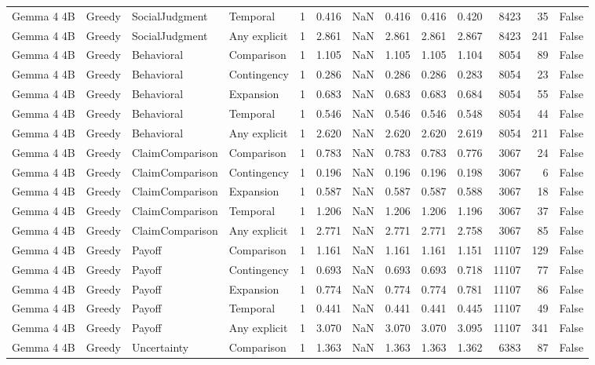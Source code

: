 \begin{tabular}{llllrrrrrrrrr}
Gemma 4 4B & Greedy & SocialJudgment & Temporal & 1 & 0.416 & NaN & 0.416 & 0.416 & 0.420 & 8423 & 35 & False \\
Gemma 4 4B & Greedy & SocialJudgment & Any explicit & 1 & 2.861 & NaN & 2.861 & 2.861 & 2.867 & 8423 & 241 & False \\
Gemma 4 4B & Greedy & Behavioral & Comparison & 1 & 1.105 & NaN & 1.105 & 1.105 & 1.104 & 8054 & 89 & False \\
Gemma 4 4B & Greedy & Behavioral & Contingency & 1 & 0.286 & NaN & 0.286 & 0.286 & 0.283 & 8054 & 23 & False \\
Gemma 4 4B & Greedy & Behavioral & Expansion & 1 & 0.683 & NaN & 0.683 & 0.683 & 0.684 & 8054 & 55 & False \\
Gemma 4 4B & Greedy & Behavioral & Temporal & 1 & 0.546 & NaN & 0.546 & 0.546 & 0.548 & 8054 & 44 & False \\
Gemma 4 4B & Greedy & Behavioral & Any explicit & 1 & 2.620 & NaN & 2.620 & 2.620 & 2.619 & 8054 & 211 & False \\
Gemma 4 4B & Greedy & ClaimComparison & Comparison & 1 & 0.783 & NaN & 0.783 & 0.783 & 0.776 & 3067 & 24 & False \\
Gemma 4 4B & Greedy & ClaimComparison & Contingency & 1 & 0.196 & NaN & 0.196 & 0.196 & 0.198 & 3067 & 6 & False \\
Gemma 4 4B & Greedy & ClaimComparison & Expansion & 1 & 0.587 & NaN & 0.587 & 0.587 & 0.588 & 3067 & 18 & False \\
Gemma 4 4B & Greedy & ClaimComparison & Temporal & 1 & 1.206 & NaN & 1.206 & 1.206 & 1.196 & 3067 & 37 & False \\
Gemma 4 4B & Greedy & ClaimComparison & Any explicit & 1 & 2.771 & NaN & 2.771 & 2.771 & 2.758 & 3067 & 85 & False \\
Gemma 4 4B & Greedy & Payoff & Comparison & 1 & 1.161 & NaN & 1.161 & 1.161 & 1.151 & 11107 & 129 & False \\
Gemma 4 4B & Greedy & Payoff & Contingency & 1 & 0.693 & NaN & 0.693 & 0.693 & 0.718 & 11107 & 77 & False \\
Gemma 4 4B & Greedy & Payoff & Expansion & 1 & 0.774 & NaN & 0.774 & 0.774 & 0.781 & 11107 & 86 & False \\
Gemma 4 4B & Greedy & Payoff & Temporal & 1 & 0.441 & NaN & 0.441 & 0.441 & 0.445 & 11107 & 49 & False \\
Gemma 4 4B & Greedy & Payoff & Any explicit & 1 & 3.070 & NaN & 3.070 & 3.070 & 3.095 & 11107 & 341 & False \\
Gemma 4 4B & Greedy & Uncertainty & Comparison & 1 & 1.363 & NaN & 1.363 & 1.363 & 1.362 & 6383 & 87 & False \\

\end{tabular}

